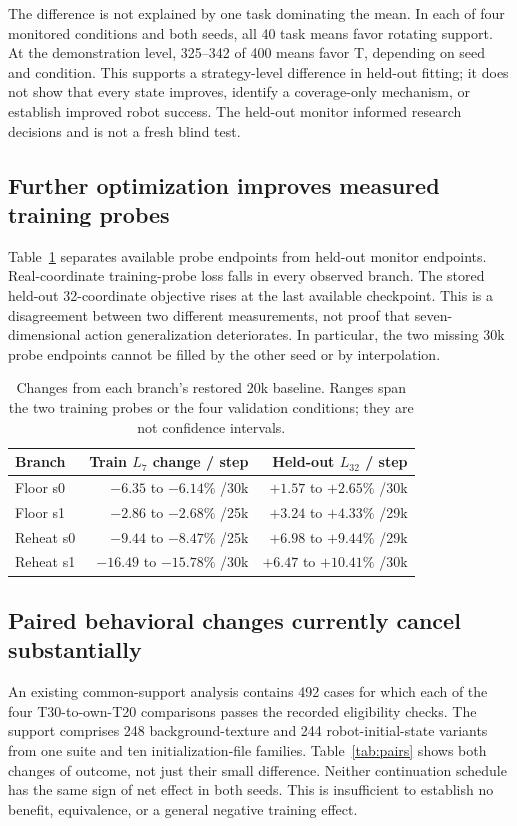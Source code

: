 \documentclass[conference]{IEEEtran}
\begin{document}
The difference is not explained by one task dominating the mean. In each of four monitored conditions and both seeds, all 40 task means favor rotating support. At the demonstration level, 325--342 of 400 means favor T, depending on seed and condition. This supports a strategy-level difference in held-out fitting; it does not show that every state improves, identify a coverage-only mechanism, or establish improved robot success. The held-out monitor informed research decisions and is not a fresh blind test.



\subsection{Further optimization improves measured training probes}
Table~\ref{tab:loss} separates available probe endpoints from held-out monitor endpoints. Real-coordinate training-probe loss falls in every observed branch. The stored held-out 32-coordinate objective rises at the last available checkpoint. This is a disagreement between two different measurements, not proof that seven-dimensional action generalization deteriorates. In particular, the two missing 30k probe endpoints cannot be filled by the other seed or by interpolation.

\begin{table}[t]
\caption{Changes from each branch's restored 20k baseline. Ranges span the two training probes or the four validation conditions; they are not confidence intervals.}
\label{tab:loss}\centering
\begin{tabular}{@{}lrr@{}}
\toprule
Branch & Train $L_7$ change / step & Held-out $L_{32}$ / step\\
\midrule
Floor s0 & $-6.35$ to $-6.14\%$ /30k & $+1.57$ to $+2.65\%$ /30k\\
Floor s1 & $-2.86$ to $-2.68\%$ /25k & $+3.24$ to $+4.33\%$ /29k\\
Reheat s0 & $-9.44$ to $-8.47\%$ /25k & $+6.98$ to $+9.44\%$ /29k\\
Reheat s1 & $-16.49$ to $-15.78\%$ /30k & $+6.47$ to $+10.41\%$ /30k\\
\bottomrule
\end{tabular}
\end{table}

\subsection{Paired behavioral changes currently cancel substantially}
An existing common-support analysis contains 492 cases for which each of the four T30-to-own-T20 comparisons passes the recorded eligibility checks. The support comprises 248 background-texture and 244 robot-initial-state variants from one suite and ten initialization-file families. Table~\ref{tab:pairs} shows both changes of outcome, not just their small difference. Neither continuation schedule has the same sign of net effect in both seeds. This is insufficient to establish no benefit, equivalence, or a general negative training effect.
\end{document}
